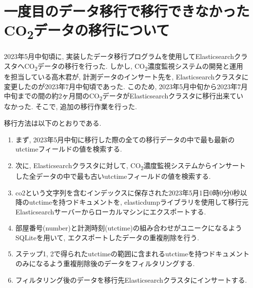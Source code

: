 \section{一度目のデータ移行で移行できなかったCO\textsubscript{2}データの移行について}

2023年5月中旬頃に, 実装したデータ移行プログラムを使用してElasticsearchクラスタへCO\textsubscript{2}データの移行を行った. しかし, CO\textsubscript{2}濃度監視システムの開発と運用を担当している高木君が, 計測データのインサート先を, Elasticsearchクラスタに変更したのが2023年7月中旬頃であった. このため, 2023年5月中旬から2023年7月中旬までの間の約2ヶ月間のCO\textsubscript{2}データがElasticsearchクラスタに移行出来ていなかった. そこで, 追加の移行作業を行った.

移行方法は以下のとおりである.

\begin{enumerate}
  \item まず, 2023年5月中旬に移行した際の全ての移行データの中で最も最新のutctimeフィールドの値を検索する.
  \item 次に, Elasticsearchクラスタに対して, CO\textsubscript{2}濃度監視システムからインサートした全データの中で最も古いutctimeフィールドの値を検索する.
  \item co2という文字列を含むインデックスに保存された2023年5月1日0時0分0秒以降のutctimeを持つドキュメントを, elasticdumpライブラリを使用して移行元Elasticsearchサーバーからローカルマシンにエクスポートする.
  \item 部屋番号(number)と計測時刻(utctime)の組み合わせがユニークになるようSQLiteを用いて, エクスポートしたデータの重複削除を行う.
  \item ステップ1, 2で得られたutctimeの範囲に含まれるutctimeを持つドキュメントのみになるよう重複削除後のデータをフィルタリングする.
  \item フィルタリング後のデータを移行先Elasticsearchクラスタにインサートする.
\end{enumerate}

